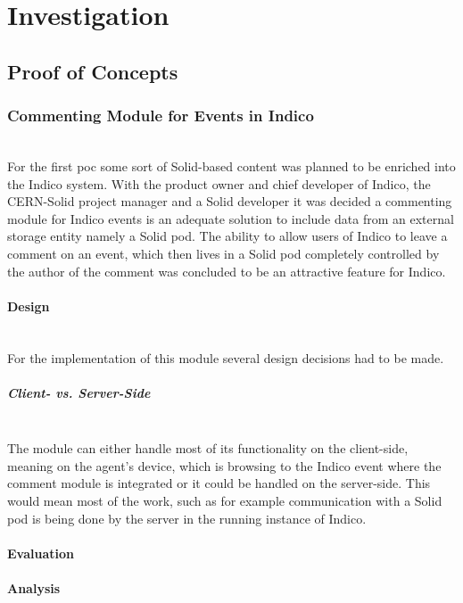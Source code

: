\section{Investigation}

\subsection{Proof of Concepts}

\subsubsection{Commenting Module for Events in Indico}\mbox{}\\

For the first \gls{poc} some sort of Solid-based content was planned to be enriched into the Indico system. With the product owner and chief developer of Indico, the CERN-Solid project manager and a Solid developer it was decided a commenting module for Indico events is an adequate solution to include data from an external storage entity namely a Solid pod. The ability to allow users of Indico to leave a comment on an event, which then lives in a Solid pod completely controlled by the author of the comment was concluded to be an attractive feature for Indico.

\paragraph{Design}\mbox{}\\

For the implementation of this module several design decisions had to be made.

\subparagraph{Client- vs. Server-Side}\mbox{}\\

The module can either handle most of its functionality on the client-side, meaning on the agent’s device, which is browsing to the Indico event where the comment module is integrated or it could be handled on the server-side. This would mean most of the work, such as for example communication with a Solid pod is being done by the server in the running instance of Indico.

\paragraph{Evaluation}
\paragraph{Analysis}

